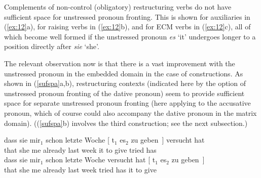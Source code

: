 \documentclass[output=paper]{langsci/langscibook}
\begin{document}
Complements of non-control (obligatory) restructuring verbs do not have
sufficient space for unstressed pronoun fronting. This is shown for auxiliaries
in (\ref{ex:12}a), for raising verbs in (\ref{ex:12}b), and for ECM verbs in
(\ref{ex:12}c), all of which become well formed if the unstressed pronoun {\it
es} \enquote*{it} undergoes longer  to a position directly after {\itshape sie}
\enquote*{she}.

\ea\label{ex:12} 
    \z
\z

The relevant observation now is that there is a vast improvement with the
unstressed pronoun in the embedded domain in the case of  constructions.
As shown in (\ref{sufspa}a,b), restructuring contexts (indicated here by the
option of unstressed pronoun fronting of the dative pronoun)  seem to provide
sufficient space for separate unstressed pronoun fronting (here applying to the
accusative pronoun, which of course could also accompany the dative pronoun in
the matrix domain).  ((\ref{sufspa}b) involves the third construction; see the
next subsection.)

\ea\label{sufspa} 
    \ea \gll dass sie  mir$_1$ schon letzte Woche [ t$_1$ es$_2$ zu geben~]
    versucht hat\\
    that she\textsubscript{\Nom} me\textsubscript{\Dat} already last week {} {} it\textsubscript{\Acc} to give tried has\\
    \ex \gll dass sie  mir$_1$ schon letzte Woche versucht hat [ t$_1$ es$_2$ zu
      geben~]\\
    that she\textsubscript{\Nom} me\textsubscript{\Dat} already last week tried has {} {} it\textsubscript{\Acc} to
    give\\
    \z
\z
\end{document}
